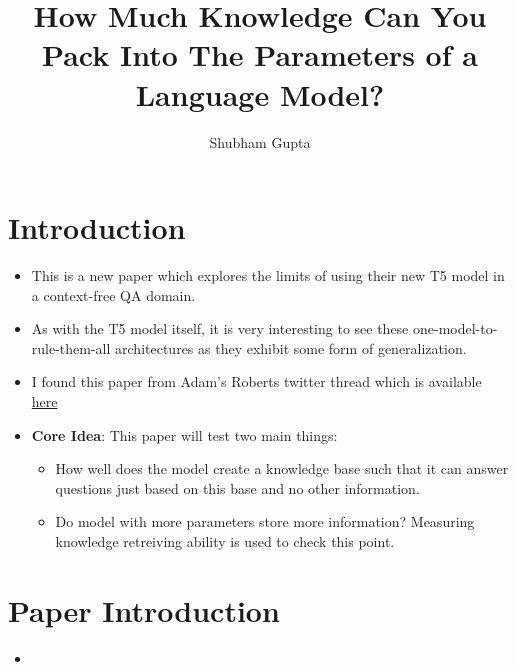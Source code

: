 \documentclass[a4paper]{article}
\title{How Much Knowledge Can You Pack Into The Parameters of a Language Model?}
\author{Shubham Gupta}
\begin{document}
\maketitle
\section{Introduction}
\begin{itemize}
    \item This is a new paper which explores the limits of using their new T5 model in a context-free QA domain.
    \item As with the T5 model itself, it is very interesting to see these one-model-to-rule-them-all architectures as they exhibit some form of generalization.
    \item I found this paper from Adam's Roberts twitter thread which is available \href{https://twitter.com/ada_rob/status/1227062195671822336}{here} 
    \item \textbf{Core Idea}: This paper will test two main things:
    \begin{itemize}
        \item How well does the model create a knowledge base such that it can answer questions just based on this base and no other information.
        \item Do model with more parameters store more information? Measuring knowledge retreiving ability is used to check this point.
    \end{itemize}
\end{itemize}
\section{Paper Introduction}
\begin{itemize}
    \item 
\end{itemize}
\end{document}
